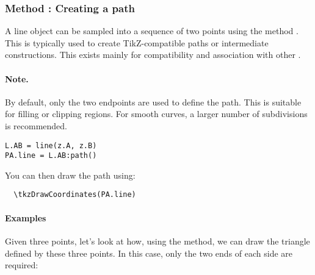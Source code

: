 \subsubsection{Method : Creating a path}
\label{ssub:line_path}

A line object can be sampled into a sequence of two points using the method . This is typically used to create TikZ-compatible paths or intermediate constructions. This 
exists mainly for compatibility and association with other .
\medskip

\paragraph{Note.}
By default, only the two endpoints are used to define the path. This is suitable for filling or clipping regions. For smooth curves, a larger number of subdivisions is recommended.

\medskip

\begin{mybox}
\begin{verbatim}
L.AB = line(z.A, z.B)
PA.line = L.AB:path()
\end{verbatim}
\end{mybox}

You can then draw the path using:

\begin{mybox}
\begin{verbatim}
  \tkzDrawCoordinates(PA.line)
\end{verbatim}
\end{mybox}

\paragraph{Examples} Given three points, let's look at how, using the  method, we can draw the triangle defined by these three points. In this case, only the two ends of each side are required:

\begin{tkzexample}[latex = .5\textwidth]
\end{tkzexample}

